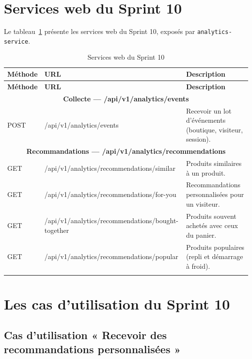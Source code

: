 \section{Services web du Sprint 10}
Le tableau~\ref{tab:ws-sprint10} présente les services web du Sprint 10, exposés par \texttt{analytics-service}.
\renewcommand{\arraystretch}{1.15}
\setlength{\tabcolsep}{4pt}
\begin{longtable}{|p{1.5cm}|p{6.8cm}|p{6.2cm}|}
\hline
\textbf{Méthode} & \textbf{URL} & \textbf{Description} \\
\hline
\endfirsthead
\hline
\textbf{Méthode} & \textbf{URL} & \textbf{Description} \\
\hline
\endhead
\multicolumn{3}{|c|}{\textbf{Collecte --- /api/v1/analytics/events}} \\
\hline
POST & /api/v1/analytics/events & Recevoir un lot d'événements (boutique, visiteur, session). \\
\hline
\multicolumn{3}{|c|}{\textbf{Recommandations --- /api/v1/analytics/recommendations}} \\
\hline
GET & /api/v1/analytics/recommendations/similar & Produits similaires à un produit. \\
\hline
GET & /api/v1/analytics/recommendations/for-you & Recommandations personnalisées pour un visiteur. \\
\hline
GET & /api/v1/analytics/recommendations/bought-together & Produits souvent achetés avec ceux du panier. \\
\hline
GET & /api/v1/analytics/recommendations/popular & Produits populaires (repli et démarrage à froid). \\
\hline
\caption{Services web du Sprint 10}
\label{tab:ws-sprint10}
\end{longtable}

\section{Les cas d'utilisation du Sprint 10}
\subsection{Cas d'utilisation « Recevoir des recommandations personnalisées »}
